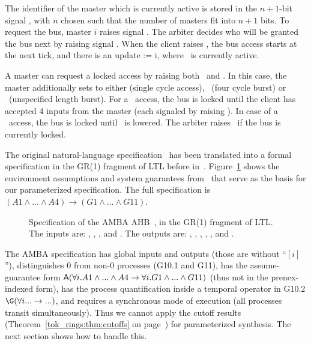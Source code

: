The identifier of the master which is 
currently active is stored in the $n+1$-bit signal \hmaster[$n$:0], 
with $n$ chosen such that the number of masters fit into $n+1$ bits.
To request the 
bus, master $i$ raises signal \hbusreqi. The arbiter decides who will be 
granted the bus next by raising signal \hgranti. When
the client raises \hready, the bus access starts at the next tick, and there 
is an update \hmaster[$n$:0] := i, where \hgranti\ is currently active.

A master can request a locked access by raising both \hbusreqi\ and \hlocki. In this case, 
the master additionally sets \hburst[1:0] to either  
(single cycle access), \hburstfour\ (four cycle burst) or \hincr\ (unspecified 
length burst). For a \hburstfour\ access, the bus is
locked until the client has accepted 4 inputs from the master (each signaled by
raising \hready). In case of a \hincr\ access, the bus is
locked until \hbusreqi\ is lowered. The arbiter raises \hmastlock\ if the bus 
is currently locked.

The original natural-language specification~\cite{AMBAspec} has been translated into a formal specification in the GR(1) fragment of LTL before in~\cite{BarbaraThesis,Bloem12,GodhalCH13}.
Figure~\ref{amba:fig:AMBAspec} shows the environment assumptions and system guarantees from~\cite{BarbaraThesis} that serve as the basis for our parameterized specification.
The full specification is 
$ (A1 \land \ldots \land A4) \rightarrow (G1 \land \ldots \land G11)$.
% 
\begin{figure}[t]
  \fbox{%
  \begin{minipage}{\textwidth}
  
  \end{minipage}}
\caption{Specification of the AMBA AHB~\cite{BarbaraThesis}, in the GR(1) fragment of LTL.
  The inputs are:
  \hburst, \hbusreq[i], \hready, and \hlock[i].
  The outputs are:
  \hmastlock, \hmaster, \hstart, \hdecide, \hlocked, and \hgrant[i].}
\label{amba:fig:AMBAspec}
\end{figure}
%

The AMBA specification has global inputs and outputs (those are without ``$[i]$''),
distinguishes 0 from non-0 processes (G10.1 and G11),
has the assume-guarantee form ${\operatorname{\mathsf{A}}}(\forall i. A1\land...\land A4 \rightarrow \forall i.G1\land...\land G11)$
(thus not in the prenex-indexed form),
has the process quantification inside a temporal operator in G10.2 $\G(\forall i... \impl ...)$,
and requires a synchronous mode of execution (all processes transit simultaneously).
Thus we cannot apply the cutoff results (Theorem~\ref{tok_rings:thm:cutoffs} on page~\pageref{tok_rings:thm:cutoffs})
for parameterized synthesis.
The next section shows how to handle this.


